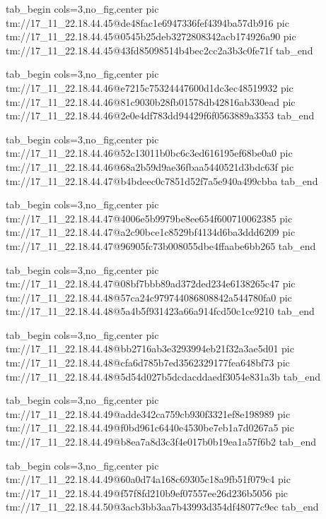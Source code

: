  
 
 
 
 

\qqSecCmtScr


\ifcmt
  tab_begin cols=3,no_fig,center
    pic tm://17_11_22.18.44.45@de48fac1e6947336fef4394ba57db916
    pic tm://17_11_22.18.44.45@0545b25deb3272808342acb174926a90
    pic tm://17_11_22.18.44.45@43fd85098514b4bec2cc2a3b3c0fe71f
  tab_end
\fi


\ifcmt
  tab_begin cols=3,no_fig,center
    pic tm://17_11_22.18.44.46@e7215c75324447600d1dc3ec48519932
    pic tm://17_11_22.18.44.46@81c9030b28fb01578db42816ab330ead
    pic tm://17_11_22.18.44.46@2e0e4df783dd94429f6f0563889a3353
  tab_end
\fi


\ifcmt
  tab_begin cols=3,no_fig,center
    pic tm://17_11_22.18.44.46@52c13011b0bc6c3ed616195ef68be0a0
    pic tm://17_11_22.18.44.46@68a2b59d9ae36fbaa5440521d3bdc63f
    pic tm://17_11_22.18.44.47@b4bdeec0c7851d52f7a5e940a499cbba
  tab_end
\fi


\ifcmt
  tab_begin cols=3,no_fig,center
    pic tm://17_11_22.18.44.47@4006e5b9979be8ee654f600710062385
    pic tm://17_11_22.18.44.47@a2c90bce1c8529bf4134d6ba3ddd6209
    pic tm://17_11_22.18.44.47@96905fc73b008055dbe4ffaabe6bb265
  tab_end
\fi


\ifcmt
  tab_begin cols=3,no_fig,center
    pic tm://17_11_22.18.44.47@08bf7bbb89ad372ded234e6138265c47
    pic tm://17_11_22.18.44.48@57ca24c979744086808842a544780fa0
    pic tm://17_11_22.18.44.48@5a4b5f931423a66a914fcd50c1ce9210
  tab_end
\fi


\ifcmt
  tab_begin cols=3,no_fig,center
    pic tm://17_11_22.18.44.48@bb2716ab3e3293994eb21f32a3ae5d01
    pic tm://17_11_22.18.44.48@cfa6d785b7ed3562329177fea648bf73
    pic tm://17_11_22.18.44.48@5d54d027b5dcdacddaedf3054e831a3b
  tab_end
\fi


\ifcmt
  tab_begin cols=3,no_fig,center
    pic tm://17_11_22.18.44.49@adde342ca759cb930f3321ef8e198989
    pic tm://17_11_22.18.44.49@f0bd961c6440e4530be7eb1a7d0267a5
    pic tm://17_11_22.18.44.49@b8ea7a8d3c3f4e017b0b19ea1a57f6b2
  tab_end
\fi


\ifcmt
  tab_begin cols=3,no_fig,center
    pic tm://17_11_22.18.44.49@60a0d74a168c69305c18a9fb51f079c4
    pic tm://17_11_22.18.44.49@f57f8fd210b9ef07557ee26d236b5056
    pic tm://17_11_22.18.44.50@3acb3bb3aa7b43993d354df48077c9ec
  tab_end
\fi


